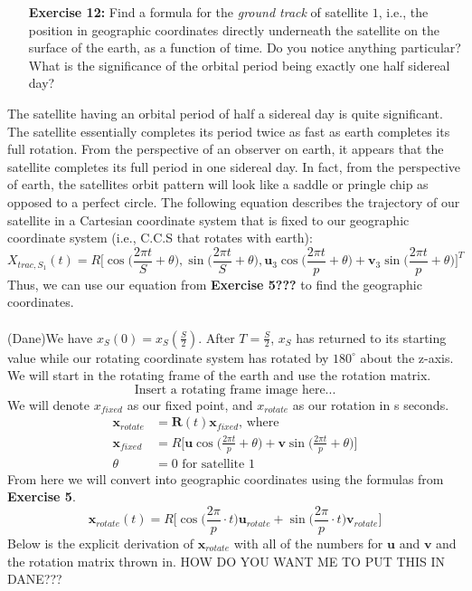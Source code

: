\documentclass[11pt]{article}
\theoremstyle{definition}
\newcommand{\1}[1]{\mathbf{1} \left \{ #1 \right \}}
\begin{document}
\begin{itemize}
\item[{\textbf{Exercise 12:}}] Find a formula for the \textit{ground track} of satellite $1$, i.e., the position in geographic coordinates directly underneath the satellite on the surface of the earth, as a function of time.  Do you notice anything particular?  What is the significance of the orbital period being exactly one half sidereal day?
\end{itemize}
The satellite having an orbital period of half a sidereal day is quite significant.  The satellite essentially completes its period twice as fast as earth completes its full rotation.  From the perspective of an observer on earth, it appears that the satellite completes its full period in one sidereal day.
In fact, from the perspective of earth, the satellites orbit pattern will look like a saddle or pringle chip as opposed to a perfect circle.  The following equation describes the trajectory of our satellite in a Cartesian coordinate system that is fixed to our geographic coordinate system (i.e., C.C.S that rotates with earth):
\begin{equation}
   X_{trac,S_1} (t) = R \Bigg[\cos \bigg(\frac{2\pi t}{S} + \theta \bigg), \sin \bigg(\frac{2\pi t}{S} + \theta \bigg), \textbf{u}_3\cos \bigg(\frac{2\pi t}{p} + \theta \bigg) + \textbf{v}_3\sin \bigg(\frac{2\pi t}{p} + \theta \bigg)\Bigg]^T
\end{equation}
Thus, we can use our equation from \textbf{Exercise 5???} to find the geographic coordinates.
\\
\\
(Dane)We have \(x_S (0) = x_S (\frac{S}{2})\).  After $T = \frac{S}{2}$, $x_S$ has returned to its starting value while our rotating coordinate system has rotated by $180^{\circ}$ about the z-axis.  We will start in the rotating frame of the earth and use the rotation matrix.
\[\text{Insert a rotating frame image here...}\]
We will denote $x_{fixed}$ as our fixed point, and $x_{rotate}$ as our rotation in s seconds.
\begin{align*}
    \textbf{x}_{rotate} &= \textbf{R}(t)\textbf{x}_{fixed} \text{, where} \\
    \textbf{x}_{fixed} &= R\Bigg[\textbf{u}\cos \bigg(\frac{2\pi t}{p} + \theta \bigg) + \textbf{v}\sin \bigg(\frac{2\pi t}{p} + \theta \bigg)\Bigg] \\
    \theta &= 0 \text{ for satellite 1}
\end{align*}
From here we will convert into geographic coordinates using the formulas from \textbf{Exercise 5}.
\[\textbf{x}_{rotate} (t) = R\Bigg[\cos \bigg(\frac{2\pi}{p} \cdot t \bigg)\textbf{u}_{rotate} + \sin \bigg(\frac{2\pi}{p} \cdot t \bigg)\textbf{v}_{rotate} \Bigg]\]
Below is the explicit derivation of $\textbf{x}_{rotate}$ with all of the numbers for $\textbf{u}$ and $\textbf{v}$ and the rotation matrix thrown in.
HOW DO YOU WANT ME TO PUT THIS IN DANE???
\end{document}
